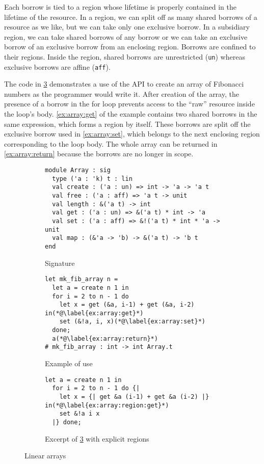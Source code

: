 Each borrow is tied to a region whose lifetime is properly
contained in the lifetime of the resource.
In a region, we can split off as many shared borrows of a resource as
we like, but we can take only one exclusive borrow. In a 
subsidiary region, we can take shared borrows of any
borrow or we can take an exclusive borrow of an exclusive borrow from an
enclosing region. Borrows are confined to their regions. Inside the region,
shared borrows are unrestricted (\lstinline/un/) whereas exclusive
borrows are affine (\lstinline/aff/).

The code in \cref{ex:array} demonstrates a use of the API to create an
array of Fibonacci numbers as the programmer would write it. After
creation of the array, the presence of a borrow in the for loop
prevents access to the ``raw'' resource inside the loop's
body. \cref{ex:array:get} of the example contains two shared borrows
in the same expression, which forms a region by itself. These borrows
are split off the exclusive borrow used in \cref{ex:array:set}, which
belongs to the next enclosing region corresponding to the loop body.
The whole array can be returned in \cref{ex:array:return} because  the
borrows are no longer in scope. 

\begin{figure}[tp]
  \centering
  \begin{subfigure}[t]{1\linewidth}
\begin{lstlisting}
module Array : sig
  type ('a : 'k) t : lin
  val create : ('a : un) => int -> 'a -> 'a t
  val free : ('a : aff) => 'a t -> unit
  val length : &('a t) -> int
  val get : ('a : un) => &('a t) * int -> 'a
  val set : ('a : aff) => &!('a t) * int * 'a -> unit
  val map : (&'a -> 'b) -> &('a t) -> 'b t
end
\end{lstlisting}
    \vspace{-15pt}
    \caption{Signature}
    \label{sig:array}
  \end{subfigure}

  \begin{subfigure}[t]{1\linewidth}
\begin{lstlisting}
let mk_fib_array n =
  let a = create n 1 in
  for i = 2 to n - 1 do
    let x = get (&a, i-1) + get (&a, i-2) in(*@\label{ex:array:get}*)
    set (&!a, i, x)(*@\label{ex:array:set}*)
  done;
  a(*@\label{ex:array:return}*)
# mk_fib_array : int -> int Array.t
\end{lstlisting}
    \vspace{-10pt}
    \caption{Example of use}
    \label{ex:array}
\begin{lstlisting}[firstnumber=2]
  let a = create n 1 in
  for i = 2 to n - 1 do {|
    let x = {| get &a (i-1) + get &a (i-2) |} in(*@\label{ex:array:region:get}*)
    set &!a i x
  |} done;
\end{lstlisting}
    \vspace{-10pt}
    \caption{Excerpt of \cref{ex:array} with explicit regions}
    \label{ex:array:region}
  \end{subfigure}
  \vspace{-5pt}
  \caption{Linear arrays}
  \label{ex:array}
\end{figure}

